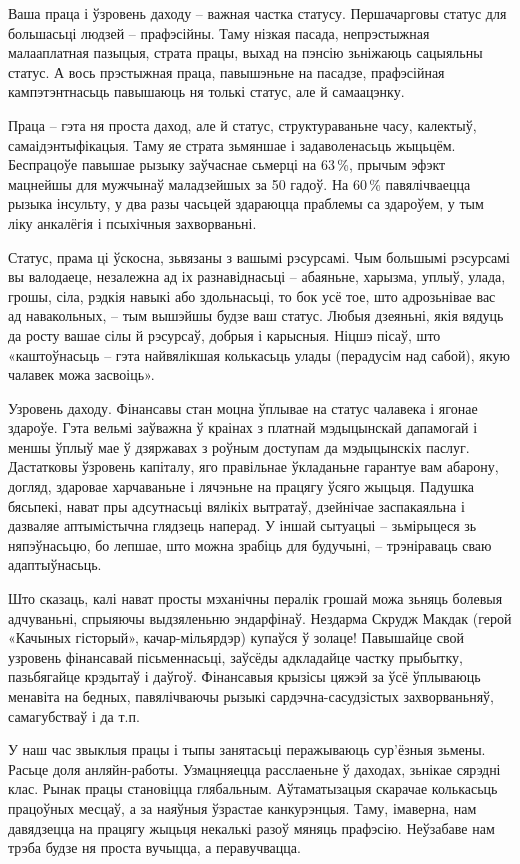 Ваша праца і ўзровень даходу – важная частка статусу. Першачарговы статус для большасьці людзей – прафэсійны. Таму нізкая пасада, непрэстыжная малааплатная пазыцыя, страта працы, выхад на пэнсію зьніжаюць сацыяльны статус. А вось прэстыжная праца, павышэньне на пасадзе, прафэсійная кампэтэнтнасьць павышаюць ня толькі статус, але й самаацэнку.

Праца – гэта ня проста даход, але й статус, структураваньне часу, калектыў, самаідэнтыфікацыя. Таму яе страта зьмяншае і задаволенасьць жыцьцём. Беспрацоўе павышае рызыку заўчаснае сьмерці на 63\,\%, прычым эфэкт мацнейшы для мужчынаў маладзейшых за 50 гадоў. На 60\,\% павялічваецца рызыка інсульту, у два разы часьцей здараюцца праблемы са здароўем, у тым ліку анкалёгія і псыхічныя захворваньні.

Статус, прама ці ўскосна, зьвязаны з вашымі рэсурсамі. Чым большымі рэсурсамі вы валодаеце, незалежна ад іх разнавіднасьці – абаяньне, харызма, уплыў, улада, грошы, сіла, рэдкія навыкі або здольнасьці, то бок усё тое, што адрозьнівае вас ад навакольных, – тым вышэйшы будзе ваш статус. Любыя дзеяньні, якія вядуць да росту вашае сілы й рэсурсаў, добрыя і карысныя. Ніцшэ пісаў, што «каштоўнасьць – гэта найвялікшая колькасьць улады (перадусім над сабой), якую чалавек можа засвоіць».

Узровень даходу. Фінансавы стан моцна ўплывае на статус чалавека і ягонае здароўе. Гэта вельмі заўважна ў краінах з платнай мэдыцынскай дапамогай і меншы ўплыў мае ў дзяржавах з роўным доступам да мэдыцынскіх паслуг. Дастатковы ўзровень капіталу, яго правільнае ўкладаньне гарантуе вам абарону, догляд, здаровае харчаваньне і лячэньне на працягу ўсяго жыцьця. Падушка бясьпекі, нават пры адсутнасьці вялікіх вытратаў, дзейнічае заспакаяльна і дазваляе аптымістычна глядзець наперад. У іншай сытуацыі – зьмірыцеся зь няпэўнасьцю, бо лепшае, што можна зрабіць для будучыні, – трэніраваць сваю адаптыўнасьць.

Што сказаць, калі нават просты мэханічны пералік грошай можа зьняць болевыя адчуваньні, спрыяючы выдзяленьню эндарфінаў. Нездарма Скрудж Макдак (герой «Качыных гісторый», качар-мільярдэр) купаўся ў золаце! Павышайце свой узровень фінансавай пісьменнасьці, заўсёды адкладайце частку прыбытку, пазьбягайце крэдытаў і даўгоў. Фінансавыя крызісы цяжэй за ўсё ўплываюць менавіта на бедных, павялічваючы рызыкі сардэчна-сасудзістых захворваньняў, самагубстваў і да т.п.

У наш час звыклыя працы і тыпы занятасьці перажываюць сур'ёзныя зьмены. Расьце доля анляйн-работы. Узмацняецца расслаеньне ў даходах, зьнікае сярэдні клас. Рынак працы становіцца глябальным. Аўтаматызацыя скарачае колькасьць працоўных месцаў, а за наяўныя ўзрастае канкурэнцыя. Таму, імаверна, нам давядзецца на працягу жыцьця некалькі разоў мяняць прафэсію. Неўзабаве нам трэба будзе ня проста вучыцца, а перавучвацца.


